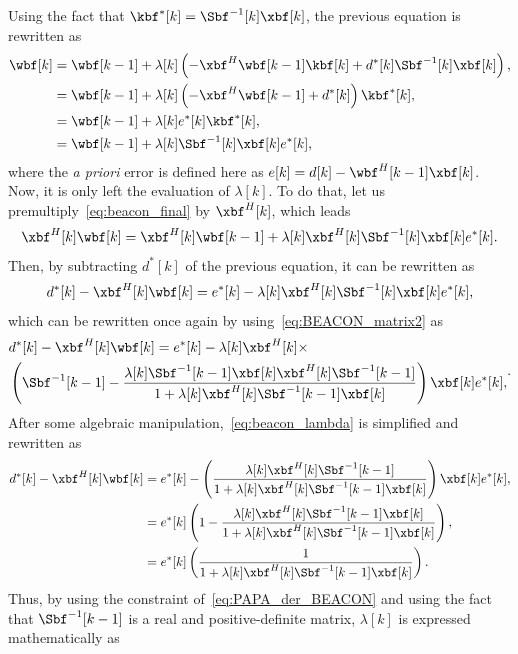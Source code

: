 Using the fact that $\kbf^*[k] = \Sbf^{-1}[k]\xbf[k]$, the previous equation is rewritten as
\begin{align}
	\wbf[k] &= \wbf[k-1] + \lambda[k] \left(-\xbf^H\wbf[k-1] \kbf[k] +  d^*[k]\Sbf^{-1}[k]\xbf[k] \right), \nonumber \\
	&= \wbf[k-1] + \lambda[k]\left(-\xbf^H\wbf[k-1] +  d^*[k]\right)\kbf^*[k], \nonumber \\
	&= \wbf[k-1] + \lambda[k]e^*[k]\kbf^*[k], \nonumber\\ 
	&= \wbf[k-1] + \lambda[k]\Sbf^{-1}[k]\xbf[k]e^*[k],\label{eq:beacon_final}
\end{align}
where the \emph{a priori} error is defined here as $e[k] = d[k] - \wbf^H[k-1]\xbf[k]$. Now, it is only left the evaluation of $\lambda[k]$. To do that, let us premultiply~\eqref{eq:beacon_final} by $\xbf^H[k]$, which leads
\begin{align}
	\xbf^H[k]\wbf[k] = \xbf^H[k]\wbf[k-1] + \lambda[k]\xbf^H[k]\Sbf^{-1}[k]\xbf[k]e^*[k].
\end{align}
Then, by subtracting $d^*[k]$ of the previous equation, it can be rewritten as
\begin{align}
	d^*[k] - \xbf^H[k]\wbf[k] = e^*[k] - \lambda[k]\xbf^H[k]\Sbf^{-1}[k]\xbf[k]e^*[k],
\end{align}
which can be rewritten once again by using~\eqref{eq:BEACON_matrix2} as
\begin{align}
	\begin{split}\label{eq:beacon_lambda}
		&d^*[k] - \xbf^H[k]\wbf[k] = e^*[k] - \lambda[k]\xbf^H[k]\times\\
		& \left(\Sbf^{-1}[k-1] - \frac{\lambda[k]\Sbf^{-1}[k-1]\xbf[k]\xbf^H[k] \Sbf^{-1}[k-1]}{1 + \lambda[k]\xbf^H[k]\Sbf^{-1}[k-1]\xbf[k]}\right)\xbf[k]e^*[k],
	\end{split}.
\end{align}
After some algebraic manipulation,~\eqref{eq:beacon_lambda} is simplified and rewritten as
\begin{align}
	d^*[k] - \xbf^H[k]\wbf[k] &= e^*[k] - \left(\frac{\lambda[k]\xbf^H[k]\Sbf^{-1}[k-1]}{1 + \lambda[k]\xbf^H[k]\Sbf^{-1}[k-1]\xbf[k]}\right)\xbf[k]e^*[k], \nonumber \\
	&= e^*[k] \left(1 - \frac{\lambda[k]\xbf^H[k]\Sbf^{-1}[k-1]\xbf[k]}{1 + \lambda[k]\xbf^H[k]\Sbf^{-1}[k-1]\xbf[k]} \right)\nonumber, \\
	&= e^*[k] \left(\frac{1}{1 + \lambda[k]\xbf^H[k]\Sbf^{-1}[k-1]\xbf[k]}\right).
\end{align}
Thus, by using the constraint of~\eqref{eq:PAPA_der_BEACON} and using the fact that $\Sbf^{-1}[k-1]$ is a real and positive-definite matrix, $\lambda[k]$ is expressed mathematically as
